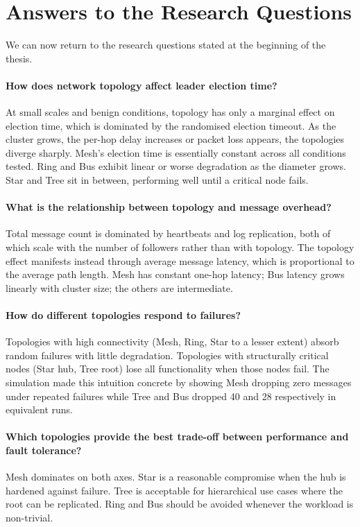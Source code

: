 \section{Answers to the Research Questions}

We can now return to the research questions stated at the beginning of the thesis.

\paragraph{How does network topology affect leader election time?}
At small scales and benign conditions, topology has only a marginal effect on election time, which is dominated by the randomised election timeout. As the cluster grows, the per-hop delay increases or packet loss appears, the topologies diverge sharply. Mesh's election time is essentially constant across all conditions tested. Ring and Bus exhibit linear or worse degradation as the diameter grows. Star and Tree sit in between, performing well until a critical node fails.

\paragraph{What is the relationship between topology and message overhead?}
Total message count is dominated by heartbeats and log replication, both of which scale with the number of followers rather than with topology. The topology effect manifests instead through average message latency, which is proportional to the average path length. Mesh has constant one-hop latency; Bus latency grows linearly with cluster size; the others are intermediate.

\paragraph{How do different topologies respond to failures?}
Topologies with high connectivity (Mesh, Ring, Star to a lesser extent) absorb random failures with little degradation. Topologies with structurally critical nodes (Star hub, Tree root) lose all functionality when those nodes fail. The simulation made this intuition concrete by showing Mesh dropping zero messages under repeated failures while Tree and Bus dropped 40 and 28 respectively in equivalent runs.

\paragraph{Which topologies provide the best trade-off between performance and fault tolerance?}
Mesh dominates on both axes. Star is a reasonable compromise when the hub is hardened against failure. Tree is acceptable for hierarchical use cases where the root can be replicated. Ring and Bus should be avoided whenever the workload is non-trivial.

